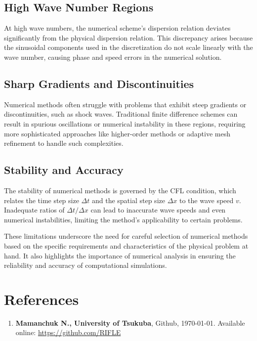 \documentclass{article}
\begin{document}
\subsection{High Wave Number Regions}
At high wave numbers, the numerical scheme's dispersion relation deviates significantly from the physical dispersion relation. This discrepancy arises because the sinusoidal components used in the discretization do not scale linearly with the wave number, causing phase and speed errors in the numerical solution.

\subsection{Sharp Gradients and Discontinuities}
Numerical methods often struggle with problems that exhibit steep gradients or discontinuities, such as shock waves. Traditional finite difference schemes can result in spurious oscillations or numerical instability in these regions, requiring more sophisticated approaches like higher-order methods or adaptive mesh refinement to handle such complexities.

\subsection{Stability and Accuracy}
The stability of numerical methods is governed by the CFL condition, which relates the time step size \(\Delta t\) and the spatial step size \(\Delta x\) to the wave speed \(v\). Inadequate ratios of \(\Delta t/\Delta x\) can lead to inaccurate wave speeds and even numerical instabilities, limiting the method's applicability to certain problems.

These limitations underscore the need for careful selection of numerical methods based on the specific requirements and characteristics of the physical problem at hand. It also highlights the importance of numerical analysis in ensuring the reliability and accuracy of computational simulations.

\section*{References}
\begin{enumerate}
    \item \textbf{Mamanchuk N., University of Tsukuba}, Github, \today. Available online: \url{https://github.com/RIFLE}
\end{enumerate}
\end{document}
